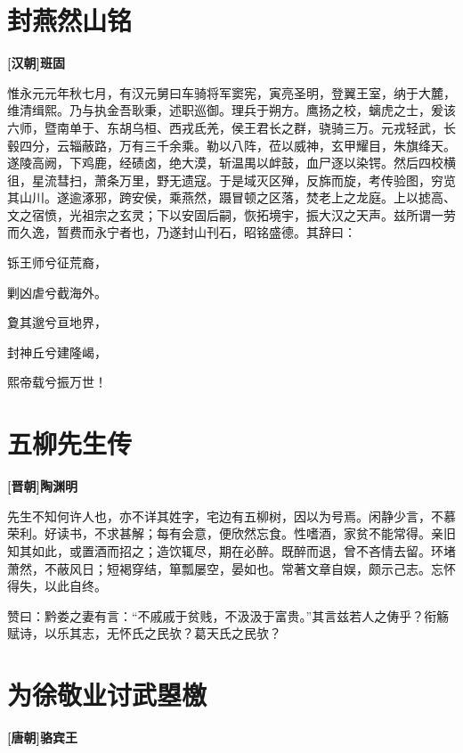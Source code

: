 \documentclass[UTF8,titlepage,oneside]{ctexbook}
\begin{document}
\chapter*{封燕然山铭}
\begin{center}
	\textbf{[汉朝]班固}
\end{center}


惟永元元年秋七月，有汉元舅曰车骑将军窦宪，寅亮圣明，登翼王室，纳于大麓，维清缉熙。乃与执金吾耿秉，述职巡御。理兵于朔方。鹰扬之校，螭虎之士，爰该六师，暨南单于、东胡乌桓、西戎氐羌，侯王君长之群，骁骑三万。元戎轻武，长毂四分，云辎蔽路，万有三千余乘。勒以八阵，莅以威神，玄甲耀目，朱旗绛天。遂陵高阙，下鸡鹿，经碛卤，绝大漠，斩温禺以衅鼓，血尸逐以染锷。然后四校横徂，星流彗扫，萧条万里，野无遗寇。于是域灭区殚，反旆而旋，考传验图，穷览其山川。遂逾涿邪，跨安侯，乘燕然，蹑冒顿之区落，焚老上之龙庭。上以摅高、文之宿愤，光祖宗之玄灵；下以安固后嗣，恢拓境宇，振大汉之天声。兹所谓一劳而久逸，暂费而永宁者也，乃遂封山刊石，昭铭盛德。其辞曰：

\begin{center}
	
	铄王师兮征荒裔，
	
	剿凶虐兮截海外。
	
	夐其邈兮亘地界，
	
	封神丘兮建隆嵑，
	
	熙帝载兮振万世！
	
\end{center}


\chapter*{五柳先生传}
\begin{center}
	\textbf{[晋朝]陶渊明}
\end{center}


先生不知何许人也，亦不详其姓字，宅边有五柳树，因以为号焉。闲静少言，不慕荣利。好读书，不求甚解；每有会意，便欣然忘食。性嗜酒，家贫不能常得。亲旧知其如此，或置酒而招之；造饮辄尽，期在必醉。既醉而退，曾不吝情去留。环堵萧然，不蔽风日；短褐穿结，箪瓢屡空，晏如也。常著文章自娱，颇示己志。忘怀得失，以此自终。


赞曰：黔娄之妻有言：“不戚戚于贫贱，不汲汲于富贵。”其言兹若人之俦乎？衔觞赋诗，以乐其志，无怀氏之民欤？葛天氏之民欤？



\chapter*{为徐敬业讨武曌檄}
\begin{center}
	\textbf{[唐朝]骆宾王}
\end{center}
\end{document}
